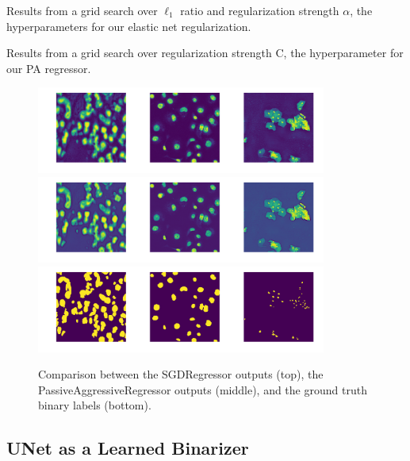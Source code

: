 \documentclass[paper=letter, fontsize=12pt]{article}
\numberwithin{equation}{section} %
\numberwithin{figure}{section} %
\numberwithin{table}{section} %
\begin{document}
\begin{table}[H]
    \centering
    \caption{Results from a grid search over $\ell_1$ ratio and regularization
    strength $\alpha$, the hyperparameters for our elastic net regularization.}
    \label{tab:sgd-gs}
    \vspace{0.25cm}
    
\end{table}

\begin{table}[H]
    \centering
    \caption{Results from a grid search over regularization strength C, the
    hyperparameter for our PA regressor.}
    \label{tab:pa-gs}
    \vspace{0.25cm}
    
\end{table}

\begin{figure}[H]
    \centering
    \includegraphics[width=0.85\textwidth]{./figs/sgd-output.png}
    \includegraphics[width=0.85\textwidth]{./figs/pa-output.png}
    \includegraphics[width=0.85\textwidth]{./figs/ground-truth-binary.png}
    \caption{Comparison between the SGDRegressor outputs (top), the
    PassiveAggressiveRegressor outputs (middle), and the ground truth binary
    labels (bottom).}
    \label{fig:lin-mod-out}
\end{figure}

\subsection{UNet as a Learned Binarizer}
\end{document}
